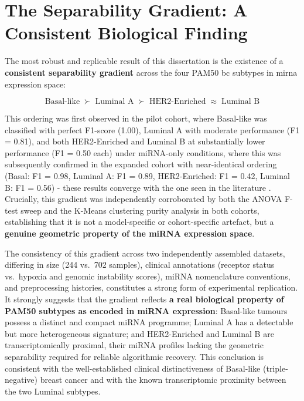 \section{The Separability Gradient: A Consistent Biological Finding}
\label{sec:disc_gradient}
 
The most robust and replicable result of this dissertation is the existence of a
\textbf{consistent separability gradient} across the four PAM50 \gls{bc}
subtypes in \gls{mirna} expression space:
 
\begin{equation}
    \text{Basal-like} \;\succ\; \text{Luminal A} \;\succ\;
    \text{HER2-Enriched} \;\approx\; \text{Luminal B}
    \label{eq:gradient}
\end{equation}
 
This ordering was first observed in the pilot cohort, where Basal-like was
classified with perfect F1-score (1.00), Luminal A with moderate performance
(F1 = 0.81), and both HER2-Enriched and Luminal B at substantially lower performance
(F1 = 0.50 each) under miRNA-only conditions, where this was subsequently confirmed in the
expanded cohort with near-identical ordering (Basal: F1 = 0.98, Luminal A:
F1 = 0.89, HER2-Enriched: F1 = 0.42, Luminal B: F1 = 0.56) - these results converge with 
the one seen in the literature \cite{GAIN_BRCA_Patel2025}. Crucially, this
gradient was independently corroborated by both the ANOVA F-test sweep and the
K-Means clustering purity analysis in both cohorts, establishing that it is not a
model-specific or cohort-specific artefact, but a \textbf{genuine geometric property
of the miRNA expression space}.
 
The consistency of this gradient across two independently assembled datasets, 
differing in size (244 vs.\ 702 samples), clinical annotations (receptor status
vs.\ hypoxia and genomic instability scores), miRNA nomenclature conventions, and
preprocessing histories, constitutes a strong form of experimental replication. It
strongly suggests that the gradient reflects \textbf{a real biological property of
PAM50 subtypes as encoded in miRNA expression}: Basal-like tumours possess a distinct
and compact miRNA programme; Luminal A has a detectable but more heterogeneous
signature; and HER2-Enriched and Luminal B are transcriptomically proximal, their
miRNA profiles lacking the geometric separability required for reliable algorithmic
recovery. This conclusion is consistent with the well-established clinical
distinctiveness of Basal-like (triple-negative) breast cancer
\cite{bc_molecular_Perou2000} and with the known transcriptomic proximity between
the two Luminal subtypes.
 
